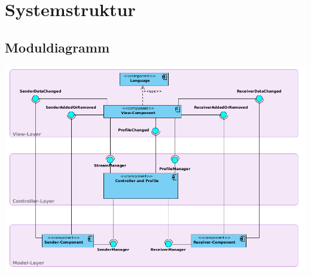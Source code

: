 \chapter{Systemstruktur}
\label{cha:syst}
\section{Moduldiagramm}
\label{sec:usec}


\includegraphics[width=15cm]{images/Overview.png}\\

